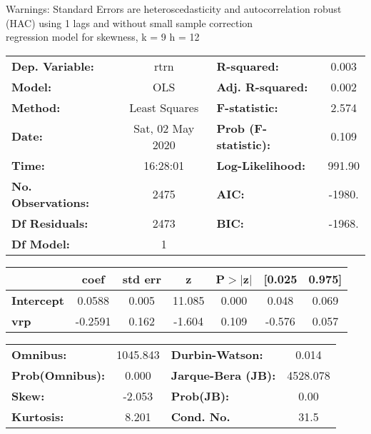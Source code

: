 Warnings: \newline
 [1] Standard Errors are heteroscedasticity and autocorrelation robust (HAC) using 1 lags and without small sample correction\\ 

regression model for skewness, k = 9 h = 12\begin{center}
\begin{tabular}{lclc}
\toprule
\textbf{Dep. Variable:}    &       rtrn       & \textbf{  R-squared:         } &     0.003   \\
\textbf{Model:}            &       OLS        & \textbf{  Adj. R-squared:    } &     0.002   \\
\textbf{Method:}           &  Least Squares   & \textbf{  F-statistic:       } &     2.574   \\
\textbf{Date:}             & Sat, 02 May 2020 & \textbf{  Prob (F-statistic):} &    0.109    \\
\textbf{Time:}             &     16:28:01     & \textbf{  Log-Likelihood:    } &    991.90   \\
\textbf{No. Observations:} &        2475      & \textbf{  AIC:               } &    -1980.   \\
\textbf{Df Residuals:}     &        2473      & \textbf{  BIC:               } &    -1968.   \\
\textbf{Df Model:}         &           1      & \textbf{                     } &             \\
\bottomrule
\end{tabular}
\begin{tabular}{lcccccc}
                   & \textbf{coef} & \textbf{std err} & \textbf{z} & \textbf{P$> |$z$|$} & \textbf{[0.025} & \textbf{0.975]}  \\
\midrule
\textbf{Intercept} &       0.0588  &        0.005     &    11.085  &         0.000        &        0.048    &        0.069     \\
\textbf{vrp}       &      -0.2591  &        0.162     &    -1.604  &         0.109        &       -0.576    &        0.057     \\
\bottomrule
\end{tabular}
\begin{tabular}{lclc}
\textbf{Omnibus:}       & 1045.843 & \textbf{  Durbin-Watson:     } &    0.014  \\
\textbf{Prob(Omnibus):} &   0.000  & \textbf{  Jarque-Bera (JB):  } & 4528.078  \\
\textbf{Skew:}          &  -2.053  & \textbf{  Prob(JB):          } &     0.00  \\
\textbf{Kurtosis:}      &   8.201  & \textbf{  Cond. No.          } &     31.5  \\
\bottomrule
\end{tabular}
\end{center}

